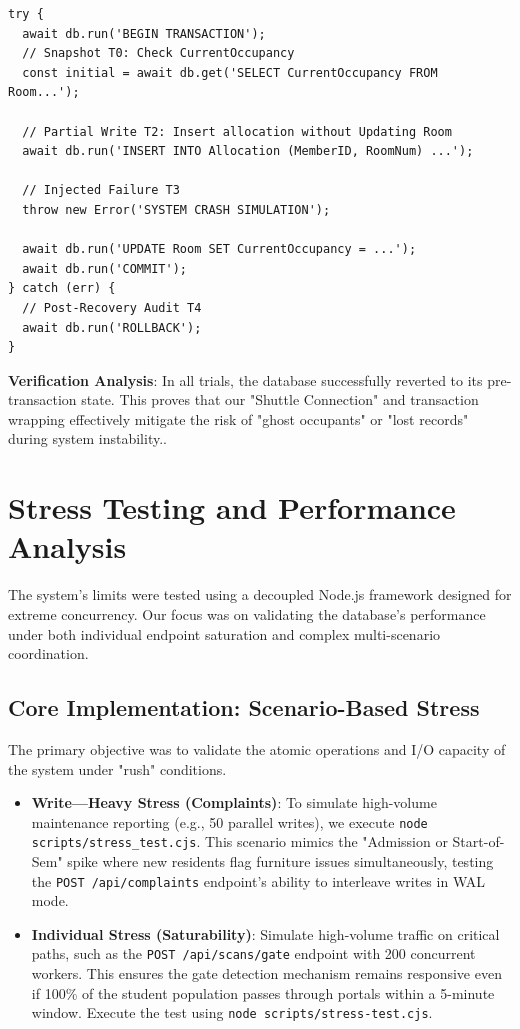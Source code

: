 \documentclass[sigconf]{acmart}
\begin{document}
\begin{lstlisting}[style=jsstyle, caption={Atomicity verification logic (failure-simulation.cjs)}]
try {
  await db.run('BEGIN TRANSACTION');
  // Snapshot T0: Check CurrentOccupancy
  const initial = await db.get('SELECT CurrentOccupancy FROM Room...');
  
  // Partial Write T2: Insert allocation without Updating Room
  await db.run('INSERT INTO Allocation (MemberID, RoomNum) ...');
  
  // Injected Failure T3
  throw new Error('SYSTEM CRASH SIMULATION');
  
  await db.run('UPDATE Room SET CurrentOccupancy = ...');
  await db.run('COMMIT');
} catch (err) {
  // Post-Recovery Audit T4
  await db.run('ROLLBACK');
}
\end{lstlisting}

\textbf{Verification Analysis}: In all trials, the database successfully reverted to its pre-transaction state. This proves that our "Shuttle Connection" and transaction wrapping effectively mitigate the risk of "ghost occupants" or "lost records" during system instability..


\section{Stress Testing and Performance Analysis}

The system's limits were tested using a decoupled Node.js framework designed for extreme concurrency. Our focus was on validating the database's performance under both individual endpoint saturation and complex multi-scenario coordination.

\subsection{Core Implementation: Scenario-Based Stress}
The primary objective was to validate the atomic operations and I/O capacity of the system under "rush" conditions.

\begin{itemize}[leftmargin=*]
    \item \textbf{Write—Heavy Stress (Complaints)}: To simulate high-volume maintenance reporting (e.g., 50 parallel writes), we execute \texttt{node scripts/stress\_test.cjs}. This scenario mimics the "Admission or Start-of-Sem" spike where new residents flag furniture issues simultaneously, testing the \texttt{POST /api/complaints} endpoint's ability to interleave writes in WAL mode.
    \item \textbf{Individual Stress (Saturability)}: Simulate high-volume traffic on critical paths, such as the \texttt{POST /api/scans/gate} endpoint with 200 concurrent workers. This ensures the gate detection mechanism remains responsive even if 100\% of the student population passes through portals within a 5-minute window. Execute the test using \texttt{node scripts/stress-test.cjs}.
\end{itemize}
\end{document}
